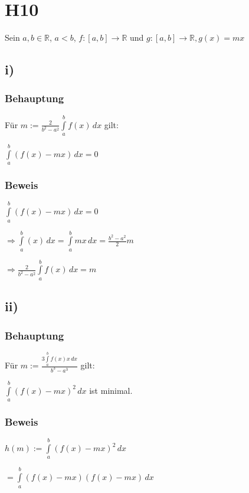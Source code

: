 \section*{H10}

Sein $a,b \in \mathbb{R}$, $a < b$, $f : [a,b] \to \mathbb{R}$ und $g:[a,b] \to \mathbb{R}, g(x)=mx$

\subsection*{i)}

\subsubsection*{Behauptung}

	Für $m := \frac{2}{b^{2}-a^{2}} \int\limits_{a}^{b}f(x) \,dx$ gilt:
	
	$\int\limits_{a}^{b}(f(x)-mx)\,dx = 0$
	
\subsubsection*{Beweis}

$\int\limits_{a}^{b}(f(x)-mx)\,dx = 0$

$\Rightarrow \int\limits_{a}^{b}(x)\,dx = \int\limits_{a}^{b}mx\,dx = \frac{b^{2}-a^{2}}{2}m$

$\Rightarrow \frac{2}{b^{2}-a^{2}} \int\limits_{a}^{b}f(x) \,dx = m$

\subsection*{ii)}

\subsubsection*{Behauptung}

Für $m := \frac{3\int\limits_{a}^{b}f(x)x\,dx}{b^{3}-a^{3}}$ gilt:

$\int\limits_{a}^{b}(f(x)-mx)^{2}\,dx$ ist minimal.

\subsubsection*{Beweis}

$ h(m) := \int\limits_{a}^{b}(f(x)-mx)^{2}\,dx$

$ = \int\limits_{a}^{b}(f(x)-mx)(f(x)-mx)\,dx$


